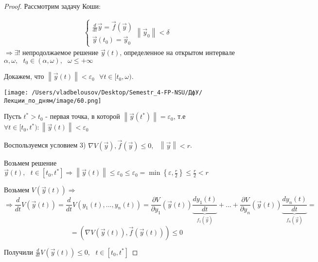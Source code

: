 \documentclass[12pt, a4paper]{report}
\begin{document}
\begin{proof}
    Рассмотрим задачу Коши: 

    \[ \begin{aligned}
        \begin{cases}
            \displaystyle \frac{d}{dt }  \vec{y}  = \vec{f }  (\vec{y}  ) \\ 
            \vec{y } (t_0 ) = \vec{y }  _0
        \end{cases}
        \left\lVert \vec{y}  _0 \right\rVert <\delta 
    \end{aligned} \] 
    \( \Rightarrow \exists  !  \) непродолжаемое решение \( \vec{y}  (t ) \), определенное на открытом интервале \( \alpha , \omega ,\text{ }  t_0 \in  (\alpha , \omega ) , \text{  } \omega \le  + \infty  \) 

    Докажем, что \( \left\lVert \vec{y } (t) \right\rVert < \varepsilon_0 \text{ }  \forall   t \in [t_0 , \omega) \). 

    \begin{center}
        \texttt{[image: /Users/vladbelousov/Desktop/Semestr\_4-FP-NSU/ДфУ/Лекции\_по\_дням/image/60.png]}
    \end{center}

    Пусть \( t^ * > t_0  \)  - первая точка, в которой \( \left\lVert \vec{y }  (t^* ) \right\rVert = \varepsilon_0 \), т.е \( \forall  t \in  [t_0,t^* ) : \left\lVert  \vec{y }  (t) \right\rVert < \varepsilon_0 \)  

    Воспользуемся условием 3) \( \nabla V (\vec{ y}  ) , \vec{f }  (\vec{y }  )  \le  0 , \text{ }  \left\lVert \vec{y }  \right\rVert < r\). 

    Возьмем решение \(\displaystyle  \vec{y}  (t ) , \text{ }  t \in  [t_0 , t^*] \Rightarrow \left\lVert \vec{y}  (t) \right\rVert \le  \varepsilon_0 \le \varepsilon_0 = \min \left\{   \varepsilon , \frac{r}{2 } \right\} \le  \frac{r}{2 }  <r \) 

    Возьмем \(\displaystyle  V (\vec{y }  (t ) ) \Rightarrow   \) 
    \[ \Rightarrow\frac{d}{dt }  V(\vec{y}  (t ) ) = \frac{d}{dt }  V (y_1(t ),..., y_n (t)) = \frac{\partial  V }{\partial  y_1 } (\vec{y}  (t ) )\underbrace{ \frac{d y_1(t )}{ dt }}_{f_1 (\vec{y} )}+ ...+ \frac{\partial  V }{\partial  y_n } (\vec{y }  (t )) \underbrace{\frac{d y_n(t )}{dt} }_{f_n (\vec{y} ) } =      \] 
    \[ = ( \nabla  V(\vec{y} (t )) , \vec{f }  (\vec{y}  (t ))) \le  0 \] 
 
    Получили \( \displaystyle  \frac{d}{dt }  V(\vec{y} (t )) \le  0 , \text{ }  t \in  [ t_0 , t^*] \)  



\end{proof}
\end{document}
